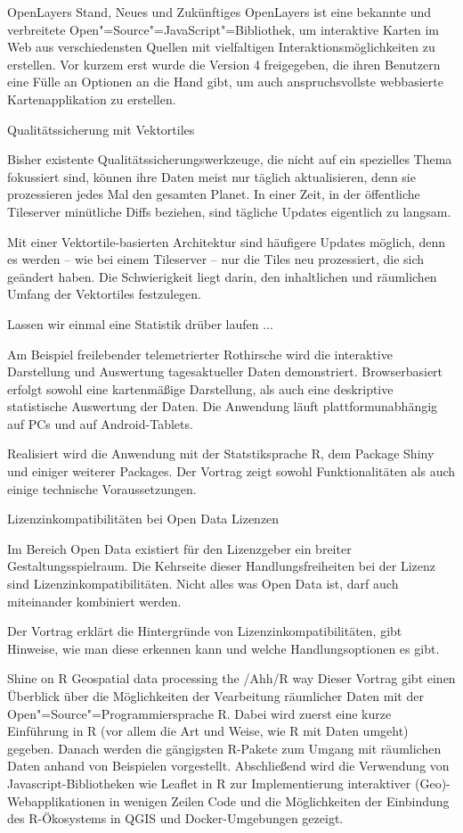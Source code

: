 %
{OpenLayers}%
{Stand, Neues und Zukünftiges}%
{OpenLayers ist eine bekannte und verbreitete
Open"=Source"=JavaScript"=Bibliothek, um interaktive Karten im Web aus
verschiedensten Quellen mit vielfaltigen Interaktionsmöglichkeiten zu
erstellen. Vor kurzem erst wurde die Version 4 freigegeben, die ihren
Benutzern eine Fülle an Optionen an die Hand gibt, um auch
anspruchsvollste webbasierte Kartenapplikation zu erstellen.}

%
{Qualitätssicherung mit Vektortiles}%
{}%
{Bisher existente Qualitätssicherungswerkzeuge, die nicht auf ein spezielles Thema fokussiert sind,
  können ihre Daten meist nur täglich aktualisieren, denn sie prozessieren jedes Mal den gesamten
  Planet. In einer Zeit, in der öffentliche Tileserver minütliche Diffs beziehen, sind tägliche
  Updates eigentlich zu langsam.

Mit einer Vektortile-basierten Architektur sind häufigere Updates möglich, denn es werden – wie bei
einem Tileserver – nur die Tiles neu prozessiert, die sich geändert haben. Die Schwierigkeit liegt
darin, den inhaltlichen und räumlichen Umfang der Vektortiles festzulegen.}

%
{Lassen wir einmal eine Statistik drüber laufen ...}%
{}%
{Am Beispiel freilebender telemetrierter Rothirsche wird die interaktive Darstellung und Auswertung
tagesaktueller Daten demonstriert. Browserbasiert erfolgt sowohl eine kartenmäßige Darstellung,
als auch eine deskriptive statistische Auswertung der Daten.
Die Anwendung läuft plattformunabhängig auf
PCs und auf Android-Tablets.

Realisiert wird die Anwendung mit der Statstiksprache R, dem Package Shiny und einiger weiterer
Packages. Der Vortrag zeigt sowohl Funktionalitäten als auch einige technische Voraussetzungen.}

%
{Lizenzinkompatibilitäten bei Open Data Lizenzen}%
{}%
{Im Bereich Open Data existiert für den Lizenzgeber ein breiter Gestaltungsspielraum. Die Kehrseite
  dieser Handlungsfreiheiten bei der Lizenz sind Lizenzinkompatibilitäten. Nicht alles was Open Data
  ist, darf auch miteinander kombiniert werden.

Der Vortrag erklärt die Hintergründe von Lizenzinkompatibilitäten, gibt Hinweise, wie man diese
erkennen kann und welche Handlungsoptionen es gibt.}

%
{Shine on R}%
{Geospatial data processing the /Ahh/R way}%
{Dieser Vortrag gibt einen Überblick über die Möglichkeiten der Vearbeitung räumlicher Daten mit der
  Open"=Source"=Programmiersprache R. Dabei wird zuerst eine kurze Einführung in R (vor allem die Art
  und Weise, wie R mit Daten umgeht) gegeben. Danach werden die gängigsten R-Pakete zum Umgang mit
  räumlichen Daten anhand von Beispielen vorgestellt. Abschließend wird die Verwendung von
  Javascript-Bibliotheken wie Leaflet in R zur Implementierung interaktiver (Geo)-Webapplikationen
  in wenigen Zeilen Code und die Möglichkeiten der Einbindung des R-Ökosystems in QGIS und
  Docker-Umgebungen gezeigt.}

